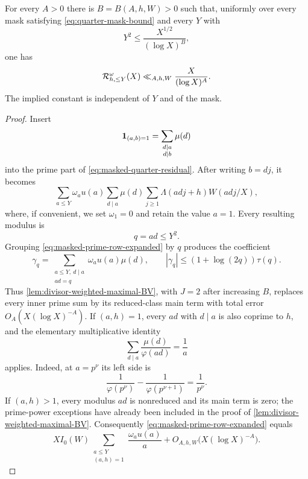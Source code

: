 \begin{theorem}
\label{thm:uniform-quarter-row-mask}
For every $A>0$ there is $B=B(A,h,W)>0$ such that, uniformly over every
mask satisfying \eqref{eq:quarter-mask-bound} and every $Y$ with
\begin{equation}
 Y^2\leq\frac{X^{1/2}}{(\log X)^B},
 \label{eq:quarter-row-range}
\end{equation}
one has
\begin{equation}
 \mathcal R_{h,\leq Y}^{\omega}(X)
 \ll_{A,h,W}\frac{X}{(\log X)^A}.
 \label{eq:uniform-quarter-row-mask}
\end{equation}
The implied constant is independent of $Y$ and of the mask.
\end{theorem}

\begin{proof}
Insert
\begin{equation}
 \mathbf 1_{(a,b)=1}=\sum_{\substack{d\mid a\\d\mid b}}\mu(d)
 \label{eq:coprime-row-inclusion-exclusion}
\end{equation}
into the prime part of \eqref{eq:masked-quarter-residual}.  After writing
$b=dj$, it becomes
\begin{equation}
 \sum_{a\leq Y}\omega_au(a)
 \sum_{d\mid a}\mu(d)
 \sum_{j\geq1}\Lambda(adj+h)W(adj/X),
 \label{eq:masked-prime-row-expanded}
\end{equation}
where, if convenient, we set $\omega_1=0$ and retain the value $a=1$.
Every resulting modulus is
\[
 q=ad\leq Y^2.
\]
Grouping \eqref{eq:masked-prime-row-expanded} by $q$ produces the
coefficient
\begin{equation}
 \gamma_q=
 \sum_{\substack{a\leq Y,\ d\mid a\\ad=q}}
 \omega_au(a)\mu(d),
 \qquad
 |\gamma_q|\leq(1+\log(2q))\tau(q).
 \label{eq:quarter-modulus-coefficient}
\end{equation}
Thus \cref{lem:divisor-weighted-maximal-BV}, with $J=2$ after increasing
$B$, replaces every inner prime sum by its reduced-class main term with
total error $O_A(X(\log X)^{-A})$.  If $(a,h)=1$, every $ad$ with $d\mid a$
is also coprime to $h$, and the elementary multiplicative identity
\begin{equation}
 \sum_{d\mid a}\frac{\mu(d)}{\varphi(ad)}=\frac1a
 \label{eq:local-density-divisor-identity}
\end{equation}
applies.  Indeed, at $a=p^\nu$ its left side is
\[
 \frac1{\varphi(p^\nu)}-\frac1{\varphi(p^{\nu+1})}
 =\frac1{p^\nu}.
\]
If $(a,h)>1$, every modulus $ad$ is nonreduced and its main term is zero;
the prime-power exceptions have already been included in the proof of
\cref{lem:divisor-weighted-maximal-BV}.  Consequently
\eqref{eq:masked-prime-row-expanded} equals
\begin{equation}
 XI_0(W)
 \sum_{\substack{a\leq Y\\(a,h)=1}}
 \frac{\omega_au(a)}a
 +O_{A,h,W}\bigl(X(\log X)^{-A}\bigr).
 \label{eq:masked-prime-row-main}
\end{equation}


\end{proof}
